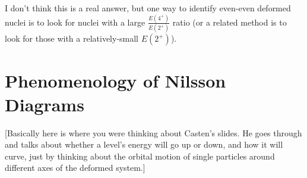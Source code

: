I don't think this is a real answer, but one way to identify even-even deformed nuclei is to look for nuclei with a large $\frac{E(4^+)}{E(2^+)}$ ratio (or a related method is to look for those with a relatively-small $E(2^+)$).

\section{Phenomenology of Nilsson Diagrams}

[Basically here is where you were thinking about Casten's slides. He goes through and talks about whether a level's energy will go up or down, and how it will curve, just by thinking about the orbital motion of single particles around different axes of the deformed system.]